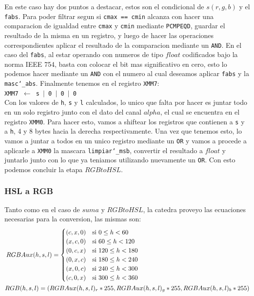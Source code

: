 En este caso hay dos puntos a destacar, estos son el condicional de $s(r,g,b)$ y el \texttt{fabs}. Para poder filtrar segun si \texttt{cmax == cmin} alcanza con hacer una comparacion de igualdad entre \texttt{cmax} y \texttt{cmin} mediante \texttt{PCMPEQD}, guardar el resultado de la misma en un registro, y luego de hacer las operaciones correspondientes aplicar el resultado de la comparacion mediante un \texttt{AND}. En el caso del \texttt{fabs}, al estar operando con numeros de tipo $float$ codificados bajo la norma IEEE 754, basta con colocar el bit mas significativo en cero, esto lo podemos hacer mediante un \texttt{AND} con el numero al cual deseamos aplicar \texttt{fabs} y la \texttt{masc\char`_abs}. Finalmente tenemos en el registro \texttt{XMM7}:\\

\noindent
\texttt{XMM7 $\gets$ s $\vert$ 0 $\vert$ 0 $\vert$ 0}\\

Con los valores de \texttt{h}, \texttt{s} y \texttt{l} calculados, lo unico que falta por hacer es juntar todo en un solo registro junto con el dato del canal $alpha$, el cual se encuentra en el registro \texttt{XMM0}. Para hacer esto, vamos a shiftear los registros que contienen a \texttt{s} y a \texttt{h}, 4 y 8 bytes hacia la derecha respectivamente. Una vez que tenemos esto, lo vamos a juntar a todos en un unico registro mediante un \texttt{OR} y vamos a procede a aplicarle a \texttt{XMM0} la mascara \texttt{limpiar\char`_msb}, convertir el resultado a $float$ y juntarlo junto con lo que ya teniamos utilizando nuevamente un \texttt{OR}. Con esto podemos concluir la etapa $RGBtoHSL$.

\subsubsection{HSL a RGB}

Tanto como en el caso de $suma$ y $RGBtoHSL$, la catedra proveyo las ecuaciones necesarias para la conversion, las mismas son:\\

\begin{align*}
RGBAux(h, s, l) =
\begin{cases}
(c,x,0) &\mbox{si}\ 0 \leq h < 60\\
(x,c,0) &\mbox{si}\ 60 \leq h < 120\\
(0,c,x) &\mbox{si}\ 120 \leq h < 180\\
(0,x,c) &\mbox{si}\ 180 \leq h < 240\\
(x,0,c) &\mbox{si}\ 240 \leq h < 300\\
(c,0,x) &\mbox{si}\ 300 \leq h < 360
\end{cases}
\hspace{62mm}
\\
RGB(h,s,l) = (RGBAux(h,s,l)_r * 255, RGBAux(h,s,l)_g * 255, RGBAux(h,s,l)_b * 255)
\end{align*}

